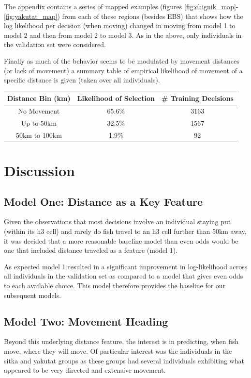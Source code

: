 \documentclass[11pt]{article}
\begin{document}
The appendix contains a series of mapped examples (figures \ref{fig:chignik_map}-\ref{fig:yakutat_map}) from each of these regions (besides EBS) that shows how the log likelihood per decision (when moving) changed in moving from model 1 to model 2 and then from model 2 to model 3. As in the above, only individuals in the validation set were considered.\newline

Finally as much of the behavior seems to be modulated by movement distances (or lack of movement) a summary table of empirical likelihood of movement of a specific distance is given (taken over all individuals). 

\begin{center}
\begin{tabular}{| c | c | c |}
\hline
Distance Bin (km) & Likelihood of Selection & \# Training Decisions \\
\hline
No Movement & 65.6\% & 3163 \\
Up to 50km & 32.5\% & 1567 \\
50km to 100km & 1.9\% & 92 \\
\hline

\end{tabular}
\end{center}


\section*{Discussion}

\subsection*{Model One: Distance as a Key Feature}
Given the observations that most decisions involve an individual staying put (within its h3 cell) and rarely do fish travel to an h3 cell further than 50km away, it was decided that a more reasonable baseline model than even odds would be one that included distance traveled as a feature (model 1). 

As expected model 1 resulted in a significant improvement in log-likelihood across all individuals in the validation set as compared to a model that gives even odds to each available choice. This model therefore provides the baseline for our subsequent models. 

\subsection*{Model Two: Movement Heading}
Beyond this underlying distance feature, the interest is in predicting, when fish move, where they will move. Of particular interest was the individuals in the sitka and yakutat groups as these groups had several individuals exhibiting what appeared to be very directed and extensive movement. 
\end{document}
